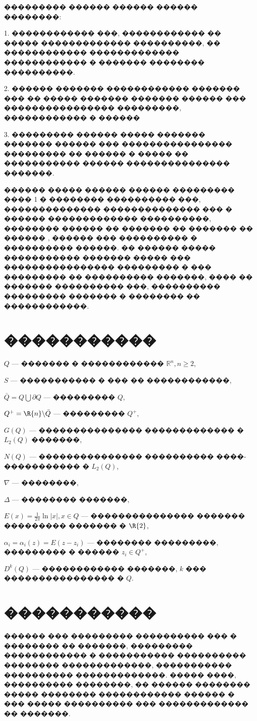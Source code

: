 \documentclass[a4paper]{article}
\begin{document}
��������� ������ ������ ������ ��������:

1. ������������ ���, ������������ �� ����� ������������� ����������, �� ������������  ������������� ������������ � ������� �������� ����������.

2. ������ ������� ������������ ������� ��� �� ����� ������� ������� ������ ��� ���������������� ���������, ������������ � ������ \cite{lezh}

3. ��������� ������  ����� ������� ������� ������ ��� ���������������� ��������� �� ������ \cite{lezh2} � ����� �� ����������� ������ ��������������� �������.


������ ����� ������ ������ ��������� ���� 1  � ��������  ���������� ���,  �������������� �������������� ��� � ������ ������������� ����������, �������� ������ �� ������� �� ������� �� ������ \cite{lezh2}, ������ ��� ���������� � ���������� ������.
�� ������ ����� ����������� ������� ����� ��� ���������������� ��������� � ��� ��������� �� ���������� �������, ���� �� ������� ���������� ���,  ���������� ��������� ������� � �������� �� ������������.

\newpage
\section{�����������}

$Q$ --- ������� � ������������ $\mathbb{R}^n, n\geq 2$, 

$S$ --- ����������� � ��� �� ������������,

$\bar Q = Q \bigcup \partial Q$ --- ��������� $Q$,

$Q^+= \R{n}\backslash \bar Q$ --- ��������� $Q^+$,

$G(Q)$ --- ��������������� ������������� � $L_2(Q)$ �������,

$N(Q)$ --- ��������������� ���������� ����-����������� � $L_2(Q)$,

$\nabla$ --- ��������,

$\Delta$ --- �������� �������,

$E(x)= \frac{1}{2\pi}  \ln |x|, x \in Q$ --- ��������������� ������� ��������� ������� � $\R{2}$,

$\alpha_i=\alpha_i(z)=E(z-z_i)$ --- �������� ���������, ��������� � ������ $z_i \in Q^+$,

$D^k(Q)$ --- ������������ �������, $k$ ��� ���������������� � $Q$.

\newpage
\section{�����������}
������ ��� ��������� ���������� ��� � �������� �� �������,
��������� ������������ � ����������� ���������� �������� �������������,
����������� ���������� �������������.
����� ����, ���������� ��������, �� ������ �������� ����� �������� ������������ ������ � ��� ����� ���������� ��� ������������� �� �������.
\end{document}
